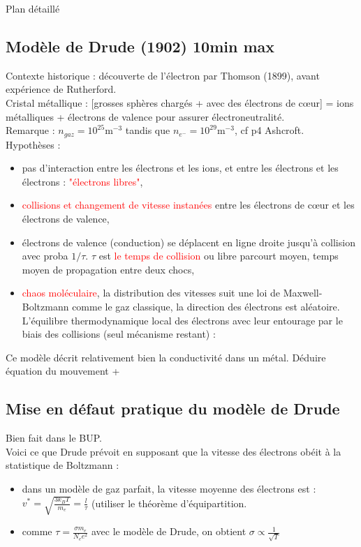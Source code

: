 \begin{reportBlock}{Plan détaillé}
\subsection{Modèle de Drude (1902) 10min max}
Contexte historique : découverte de l'électron par Thomson (1899), avant expérience de Rutherford.\\
Cristal métallique : [grosses sphères chargés + avec des électrons de c\oe ur] = ions métalliques  + électrons de valence pour assurer électroneutralité.\\
Remarque : $n_{gaz}=10^{25}$m$^{-3}$ tandis que $n_{e^{-}}=10^{29}$m$^{-3}$, cf p4 Ashcroft.\\
Hypothèses :\begin{itemize}
    \item pas d'interaction entre les électrons et les ions, et entre les électrons et les électrons : \textcolor{red}{"électrons libres"},
    \item \textcolor{red}{collisions et changement de vitesse instanées} entre les électrons de c\oe ur et les électrons de valence,
    \item électrons de valence (conduction) se déplacent en ligne droite jusqu'à collision avec proba $1/\tau$. $\tau$ est \textcolor{red}{le temps de collision} ou libre parcourt moyen, temps moyen de propagation entre deux chocs,
    \item \textcolor{red}{chaos moléculaire}, la distribution des vitesses suit une loi de Maxwell-Boltzmann comme le gaz classique, la direction des électrons est aléatoire. L'équilibre thermodynamique local des électrons avec leur entourage par le biais des collisions (seul mécanisme restant) : 
\end{itemize}

Ce modèle décrit relativement bien la conductivité dans un métal.
Déduire équation du mouvement + 
\subsection{Mise en défaut pratique du modèle de Drude}
Bien fait dans le BUP.\\
Voici ce que Drude prévoit en supposant que la vitesse des électrons obéit à la statistique de Boltzmann :
\begin{itemize}
    \item dans un modèle de gaz parfait, la vitesse moyenne des électrons est : $v^*=\sqrt{\frac{3k_BT}{m_e}}=\frac{l}{\tau}$ (utiliser le théorème d'équipartition.
    \item comme $\tau=\frac{\sigma m_e}{N_ee^2}$ avec le modèle de Drude, on obtient $\sigma\propto \frac{1}{\sqrt{T}}$
\end{itemize}


\end{reportBlock}
